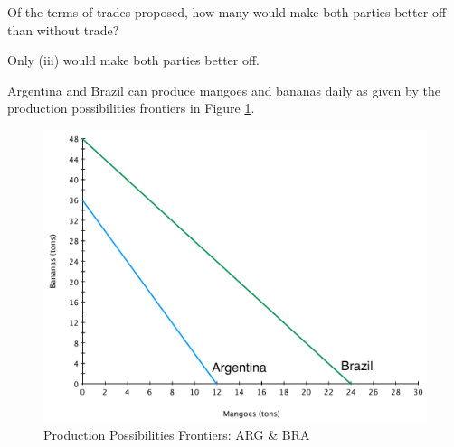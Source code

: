 \documentclass[addpoints,11pt]{exam}
\theoremstyle{definition}
\begin{document}
\begin{questions}
\question \label{q14} Of the terms of trades proposed, how many would make both parties better off than without trade?

\begin{choices}
\end{choices}

\begin{solution}
	Only (iii) would make both parties better off.
\end{solution}
	
	\question Argentina and Brazil can produce mangoes and bananas daily as given by the production possibilities frontiers in Figure \ref{fig3}. 
	
	\begin{figure}[H]
		\centering
		\includegraphics[scale=.36]{hw1_plot2.pdf}
		\caption{Production Possibilities Frontiers: ARG \& BRA}
		\label{fig3}
	\end{figure}
	
\end{questions}
\end{document}
